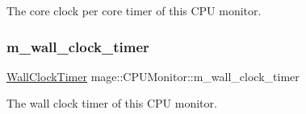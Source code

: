 The core clock per core timer of this C\+PU monitor. \hypertarget{classmage_1_1_c_p_u_monitor_ac1e3d7a7271515873a7a82a25eca4da2}{}\label{classmage_1_1_c_p_u_monitor_ac1e3d7a7271515873a7a82a25eca4da2} 
\subsubsection{\texorpdfstring{m\+\_\+wall\+\_\+clock\+\_\+timer}{m\_wall\_clock\_timer}}
{\footnotesize\ttfamily \hyperlink{namespacemage_a06f4035ef59f07892e594bf1178a108a}{Wall\+Clock\+Timer} mage\+::\+C\+P\+U\+Monitor\+::m\+\_\+wall\+\_\+clock\+\_\+timer\hspace{0.3cm}{\ttfamily [private]}}

The wall clock timer of this C\+PU monitor. 